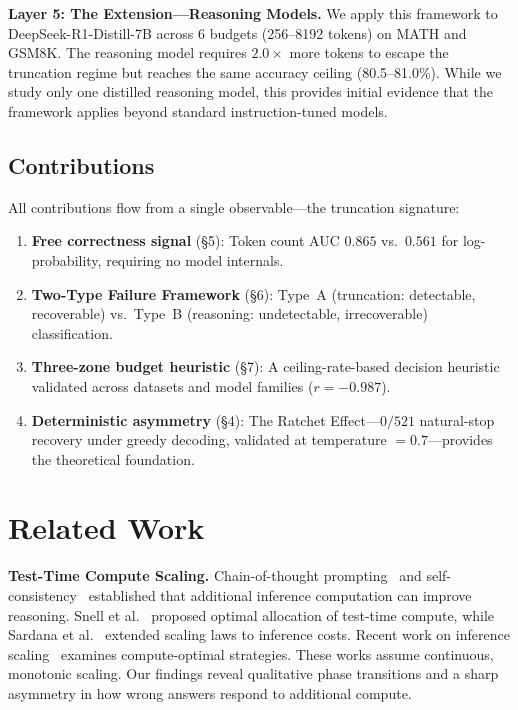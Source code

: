 \documentclass{article}
\begin{document}
\textbf{Layer 5: The Extension---Reasoning Models.}
We apply this framework to DeepSeek-R1-Distill-7B across 6 budgets (256--8192 tokens) on MATH and GSM8K. The reasoning model requires $2.0\times$ more tokens to escape the truncation regime but reaches the same accuracy ceiling (80.5--81.0\%). While we study only one distilled reasoning model, this provides initial evidence that the framework applies beyond standard instruction-tuned models.

\subsection{Contributions}

All contributions flow from a single observable---the truncation signature:
\begin{enumerate}
    \item \textbf{Free correctness signal} (\S5): Token count AUC $0.865$ vs.\ $0.561$ for log-probability, requiring no model internals.
    \item \textbf{Two-Type Failure Framework} (\S6): Type~A (truncation: detectable, recoverable) vs.\ Type~B (reasoning: undetectable, irrecoverable) classification.
    \item \textbf{Three-zone budget heuristic} (\S7): A ceiling-rate-based decision heuristic validated across datasets and model families ($r = -0.987$).
    \item \textbf{Deterministic asymmetry} (\S4): The Ratchet Effect---$0/521$ natural-stop recovery under greedy decoding, validated at temperature $= 0.7$---provides the theoretical foundation.
\end{enumerate}

\section{Related Work}

\textbf{Test-Time Compute Scaling.}
Chain-of-thought prompting~\cite{wei2022chain} and self-consistency~\cite{wang2022self} established that additional inference computation can improve reasoning. Snell et al.~\cite{snell2024scaling} proposed optimal allocation of test-time compute, while Sardana et al.~\cite{sardana2024chinchilla} extended scaling laws to inference costs. Recent work on inference scaling~\cite{brown2024large,wu2024inference} examines compute-optimal strategies. These works assume continuous, monotonic scaling. Our findings reveal qualitative phase transitions and a sharp asymmetry in how wrong answers respond to additional compute.
\end{document}
